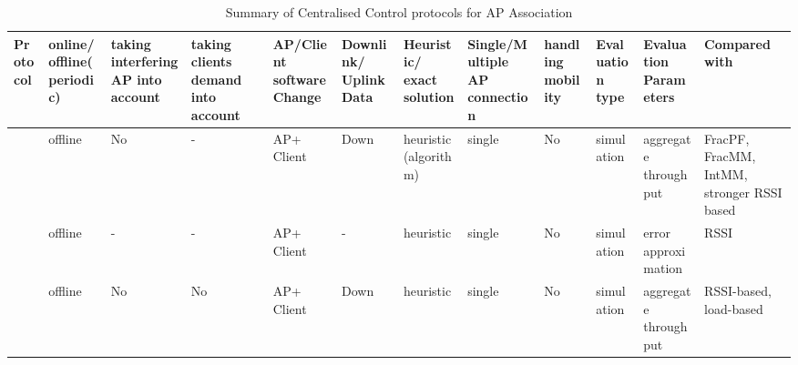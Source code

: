 \documentclass[journal,transmag]{IEEEtran}
\begin{document}
\begin{table}
\centering\caption{Summary of Centralised Control protocols for AP Association  \cite{08proportional_fairness_multiRate_LAN,08AP_assignement_algorithms,15AP_association_MIMO}
\label{Tab:centralised_proprtional_aggregate}}
\begin{tabular} {|p{1.0cm}|p{.7cm}|p{}|p{.7cm}|p{1.1cm}|p{.7cm}|p{}|p{}|p{} |p{1.7cm}|p{}|p{}|}
\hline
\cellcolor{xy}\scriptsize{Protocol} & \cellcolor{xy}\scriptsize{online/ offline(periodic)} & \cellcolor{xy}\scriptsize{taking interfering AP into account} & \cellcolor{xy}\scriptsize{taking clients demand into account} & \cellcolor{xy}\scriptsize{AP/Client software Change} & \cellcolor{xy} \scriptsize{Downlink/ Uplink Data} & \cellcolor{xy} \scriptsize{Heuristic/ exact solution} & \cellcolor{xy} \scriptsize{Single/Multiple AP connection} & \cellcolor{xy} \scriptsize{handling mobility} & \cellcolor{xy}\scriptsize{Evaluation type} & \cellcolor{xy}\scriptsize{Evaluation Parameters} & \cellcolor{xy}\scriptsize{Compared with} \\\hline\hline

\scriptsize{\cite{08proportional_fairness_multiRate_LAN}} &\scriptsize{offline} &\scriptsize{No} &\scriptsize{-} &\scriptsize{AP+ Client} &\scriptsize{Down} &\scriptsize{heuristic (algorithm)} &\scriptsize{single} &\scriptsize{No} &\scriptsize{simulation} &\scriptsize{aggregate throughput} &\scriptsize{FracPF, FracMM, IntMM, stronger RSSI based} \\\hline

\scriptsize{\cite{08AP_assignement_algorithms}} &\scriptsize{offline} &\scriptsize{-} &\scriptsize{-} &\scriptsize{AP+ Client} &\scriptsize{-} &\scriptsize{heuristic} &\scriptsize{single} &\scriptsize{No} &\scriptsize{simulation} &\scriptsize{error approximation} &\scriptsize{RSSI}\\\hline

\scriptsize{\cite{15AP_association_MIMO}} &\scriptsize{offline} &\scriptsize{No} &\scriptsize{No} &\scriptsize{AP+ Client} &\scriptsize{Down} &\scriptsize{heuristic} &\scriptsize{single} &\scriptsize{No} &\scriptsize{simulation} &\scriptsize{aggregate throughput} &\scriptsize{RSSI-based, load-based} \\\hline

\end{tabular}
\end{table} 
\end{document}

